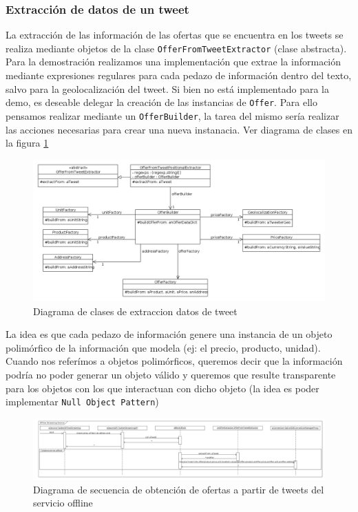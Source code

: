 \subsubsection{Extracci\'on de datos de un tweet}
La extracci\'on de las informaci\'on de las ofertas que se encuentra en los tweets se realiza mediante objetos de la clase \texttt{OfferFromTweetExtractor} (clase abstracta).
Para la demostraci\'on realizamos una implementaci\'on que extrae la informaci\'on mediante expresiones regulares para cada pedazo de informaci\'on dentro del texto, salvo para la geolocalizaci\'on del tweet.
Si bien no est\'a implementado para la demo, es deseable delegar la creaci\'on de las instancias de \texttt{Offer}. Para ello pensamos realizar mediante un \texttt{OfferBuilder}, la tarea del mismo ser\'ia realizar las acciones necesarias para crear una nueva instanacia. Ver diagrama de clases en la figura \ref{fig:class_parsing}

\begin{figure}[h]
\centerline{\includegraphics[width=0.6\paperwidth]{./imgs/class_diagram_parsing.png}}
\caption{Diagrama de clases de extraccion datos de tweet}
\label{fig:class_parsing}
\end{figure}

La idea es que cada pedazo de informaci\'on genere una instancia de un objeto polim\'orfico de la informaci\'on que modela (ej: el precio, producto, unidad). Cuando nos refer\'imos a objetos polim\'orficos, queremos decir que la informaci\'on podr\'ia no poder generar un objeto v\'alido y queremos que resulte transparente para los objetos con los que interactuan con dicho objeto (la idea es poder implementar \texttt{Null Object Pattern})

\begin{figure}[h]
\centerline{\includegraphics[width=0.6\paperwidth]{./imgs/sequence_diagram_offline_extraction.png}}
\caption{Diagrama de secuencia de obtención de ofertas a partir de tweets del servicio offline}
\label{fig:sequence_diagram_offline_extraction}
\end{figure}

